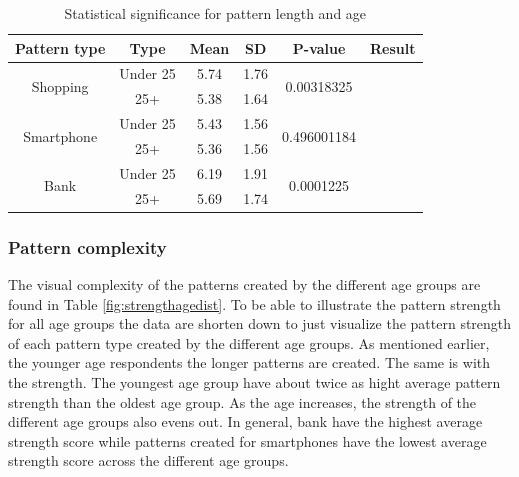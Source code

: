     \begin{table}[H]
      \centering
      \begin{tabular}{ c | c | c | c | c | c }
      \hline
        {\bf Pattern type} & {\bf Type} & {\bf Mean} & {\bf SD} & {\bf P-value} & {\bf Result} \\ \hline
        \multirow{2}{*}{Shopping}   & Under 25  & 5.74 & 1.76 & \multirow{2}{*}{0.00318325} & \multirow{2}{*}{\bf \color{olive}{Significant}} \\
                                    & 25+       & 5.38 & 1.64 & & \\ \hline
        \multirow{2}{*}{Smartphone} & Under 25  & 5.43 & 1.56 & \multirow{2}{*}{0.496001184} & \multirow{2}{*}{\bf \color{red}{Not significant}} \\
                                    & 25+       & 5.36 & 1.56 & & \\ \hline
        \multirow{2}{*}{Bank}       & Under 25  & 6.19 & 1.91 & \multirow{2}{*}{0.0001225} & \multirow{2}{*}{\bf \color{olive}{Significant}} \\
                                    & 25+       & 5.69 & 1.74 & & \\ \hline
      \end{tabular}
      \caption{Statistical significance for pattern length and age}
      \label{tab:statsigLengthAge}
    \end{table}

    \clearpage
    \subsubsection{Pattern complexity}
    The visual complexity of the patterns created by the different age groups are found in Table \ref{fig:strengthagedist}. To be able to illustrate the pattern strength for all age groups the data are shorten down to just visualize the pattern strength of each pattern type created by the different age groups. As mentioned earlier, the younger age respondents the longer patterns are created. The same is with the strength. The youngest age group have about twice as hight average pattern strength than the oldest age group. As the age increases, the strength of the different age groups also evens out. In general, bank have the highest average strength score while patterns created for smartphones have the lowest average strength score across the different age groups.

